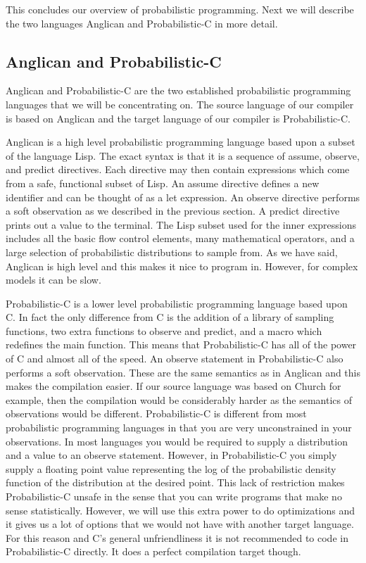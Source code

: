 \documentclass[a4paper]{article}
\begin{document}
This concludes our overview of probabilistic programming. Next we will describe the two languages Anglican and Probabilistic-C in more detail.




\subsection{Anglican and Probabilistic-C}

Anglican and Probabilistic-C are the two established probabilistic programming languages that we will be concentrating on. The source language of our compiler is based on Anglican and the target language of our compiler is Probabilistic-C.

Anglican is a high level probabilistic programming language based upon a subset of the language Lisp. The exact syntax is that it is a sequence of assume, observe, and predict directives. Each directive may then contain expressions which come from a safe, functional subset of Lisp. An assume directive defines a new identifier and can be thought of as a let expression. An observe directive performs a soft observation as we described in the previous section. A predict directive prints out a value to the terminal. The Lisp subset used for the inner expressions includes all the basic flow control elements, many mathematical operators, and a large selection of probabilistic distributions to sample from. As we have said, Anglican is high level and this makes it nice to program in. However, for complex models it can be slow.

Probabilistic-C is a lower level probabilistic programming language based upon C. In fact the only difference from C is the addition of a library of sampling functions, two extra functions to observe and predict, and a macro which redefines the main function. This means that Probabilistic-C has all of the power of C and almost all of the speed. An observe statement in Probabilistic-C also performs a soft observation. These are the same semantics as in Anglican and this makes the compilation easier. If our source language was based on Church for example, then the compilation would be considerably harder as the semantics of observations would be different. Probabilistic-C is different from most probabilistic programming languages in that you are very unconstrained in your observations. In most languages you would be required to supply a distribution and a value to an observe statement. However, in Probabilistic-C you simply supply a floating point value representing the log of the probabilistic density function of the distribution at the desired point. This lack of restriction makes Probabilistic-C unsafe in the sense that you can write programs that make no sense statistically. However, we will use this extra power to do optimizations and it gives us a lot of options that we would not have with another target language. For this reason and C's general unfriendliness it is not recommended to code in Probabilistic-C directly. It does a perfect compilation target though.
\end{document}
